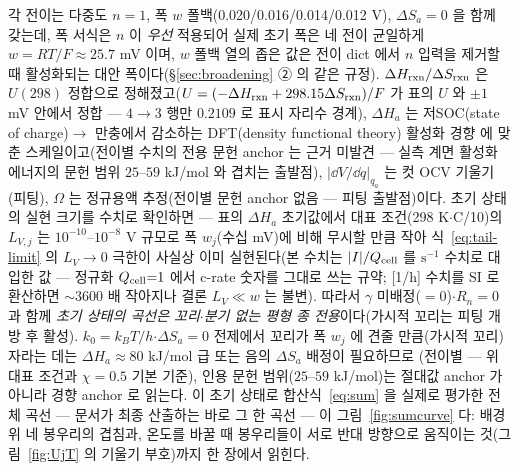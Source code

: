 각 전이는 다중도 $n=1$, 폭 $w$ 폴백(0.020/0.016/0.014/0.012 V), $\Delta S_a=0$ 을 함께 갖는데, 폭
서식은 $n$ 이 \emph{우선} 적용되어 실제 초기 폭은 네 전이 균일하게 $w=RT/F\approx25.7$ mV 이며, $w$
폴백 열의 좁은 값은 전이 dict 에서 $n$ 입력을 제거할 때 활성화되는 대안 폭이다(\S\ref{sec:broadening}
② 의 같은 규정). $\Delta H_{\mathrm{rxn}}/\Delta S_{\mathrm{rxn}}$
은 $U(298)$ 정합으로 정해졌고($U=(-\Delta H_{\mathrm{rxn}}+298.15\Delta S_{\mathrm{rxn}})/F$ 가 표의 $U$ 와 $\pm1$ mV 안에서 정합 --- $4\!\to\!3$ 행만 $0.2109$ 로 표시 자리수 경계), $\Delta H_a$ 는 저SOC(state of charge)$\to$
만충에서 감소하는 DFT(density functional theory) 활성화 경향\cite{persson2010,persson2010b} 에 맞춘
스케일이고(전이별 수치의 전용 문헌 anchor 는 근거 미발견 --- 실측 계면 활성화 에너지의 문헌 범위
$25$--$59$ kJ/mol 와 겹치는 출발점), $|\dd V/\dd q|_{q_a}$ 는 컷 OCV 기울기(피팅), $\Omega$ 는 정규용액
추정(전이별 문헌 anchor 없음 --- 피팅 출발점)이다.
초기 상태의 실현 크기를 수치로 확인하면 --- 표의 $\Delta H_a$ 초기값에서 대표 조건(298 K$\cdot$C/10)의
$L_{V,j}$ 는 $10^{-10}$--$10^{-8}$ V 규모로 폭 $w_j$(수십 mV)에 비해 무시할 만큼 작아 식~\eqref{eq:tail-limit} 의 $L_V\to0$ 극한이 사실상 이미 실현된다(본 수치는 $|I|/Q_{\mathrm{cell}}$ 를 $\mathrm s^{-1}$ 수치로 대입한 값 --- 정규화 $Q_{\mathrm{cell}}{=}1$ 에서 c-rate 숫자를 그대로 쓰는 규약; [1/h] 수치를 SI 로 환산하면 $\sim3600$ 배 작아지나 결론 $L_V\!\ll\!w$ 는 불변). 따라서 $\gamma$ 미배정($=0$)$\cdot$$R_n=0$ 과 함께 \emph{초기 상태의 곡선은 꼬리$\cdot$분기 없는 평형
종 전용}이다(가시적 꼬리는 피팅 개방 후 활성). $k_0=k_BT/h$$\cdot$$\Delta S_a{=}0$ 전제에서 꼬리가
폭 $w_j$ 에 견줄 만큼(가시적 꼬리) 자라는 데는 $\Delta H_a\approx80$ kJ/mol 급 또는 음의 $\Delta S_a$ 배정이 필요하므로
(전이별 --- 위 대표 조건과 $\chi=0.5$ 기본 기준), 인용 문헌
범위($25$--$59$ kJ/mol)는 절대값 anchor 가 아니라 경향 anchor 로 읽는다.
이 초기 상태로 합산식~\eqref{eq:sum} 을 실제로 평가한 전체 곡선 --- 문서가 최종 산출하는 바로 그 한 곡선 ---
이 그림~\ref{fig:sumcurve} 다: 배경 위 네 봉우리의 겹침과, 온도를 바꿀 때 봉우리들이 서로 반대 방향으로
움직이는 것(그림~\ref{fig:UjT} 의 기울기 부호)까지 한 장에서 읽힌다.

